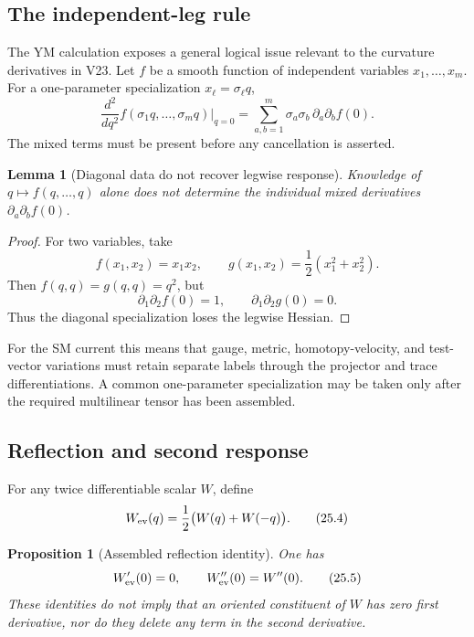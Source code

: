 \documentclass[11pt]{article}
\newtheorem{lemma}[theorem]{Lemma}
\newtheorem{proposition}[theorem]{Proposition}
\begin{document}
\subsection{The independent-leg rule}

The YM calculation exposes a general logical issue relevant to the
curvature derivatives in V23.  Let \(f\) be a smooth function of
independent variables \(x_1,\ldots,x_m\).  For a one-parameter
specialization \(x_\ell=\sigma_\ell q\),
\[
 \frac{d^2}{dq^2}f(\sigma_1q,\ldots,\sigma_mq)\bigg|_{q=0}
 =
 \sum_{a,b=1}^m
 \sigma_a\sigma_b\,\partial_a\partial_b f(0).
 \tag{25.2}
\]
The mixed terms must be present before any cancellation is asserted.

\begin{lemma}[Diagonal data do not recover legwise response]
\label{lem:v11v25-diagonal}
Knowledge of \(q\mapsto f(q,\ldots,q)\) alone does not determine the
individual mixed derivatives \(\partial_a\partial_bf(0)\).
\end{lemma}

\begin{proof}
For two variables, take
\[
 f(x_1,x_2)=x_1x_2,\qquad
 g(x_1,x_2)=\frac12(x_1^2+x_2^2).
 \tag{25.3}
\]
Then \(f(q,q)=g(q,q)=q^2\), but
\[
 \partial_1\partial_2f(0)=1,\qquad
 \partial_1\partial_2g(0)=0.
\]
Thus the diagonal specialization loses the legwise Hessian.
\end{proof}

For the SM current this means that gauge, metric, homotopy-velocity, and
test-vector variations must retain separate labels through the
projector and trace differentiations.  A common one-parameter
specialization may be taken only after the required multilinear tensor
has been assembled.

\subsection{Reflection and second response}

For any twice differentiable scalar \(W\), define
\[
 W_{\rm ev}(q)=\frac12\bigl(W(q)+W(-q)\bigr).
 \tag{25.4}
\]

\begin{proposition}[Assembled reflection identity]
\label{prop:v11v25-reflection}
One has
\[
 W_{\rm ev}'(0)=0,\qquad W_{\rm ev}''(0)=W''(0).
 \tag{25.5}
\]
These identities do not imply that an oriented constituent of \(W\)
has zero first derivative, nor do they delete any term in the second
derivative.
\end{proposition}
\end{document}
